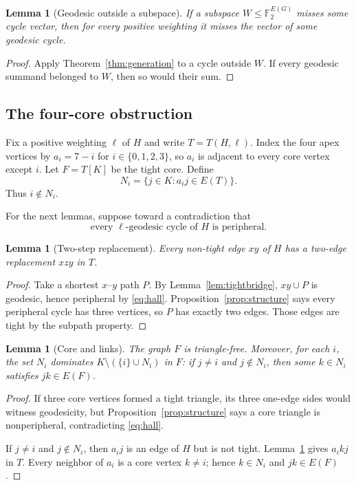 \documentclass[11pt]{amsart}
\newtheorem{lemma}[theorem]{Lemma}
\theoremstyle{definition}
\newcommand{\Ftwo}{\mathbb{F}_2}
\begin{document}
\begin{lemma}[Geodesic outside a subspace]\label{lem:geooutside}
If a subspace $W\leq\Ftwo^{E(G)}$ misses some cycle vector, then for every positive weighting it misses the vector of some geodesic cycle.
\end{lemma}

\begin{proof}
Apply Theorem~\ref{thm:generation} to a cycle outside $W$.  If every geodesic summand belonged to $W$, then so would their sum.
\end{proof}

\subsection{The four-core obstruction}

Fix a positive weighting $\ell$ of $H$ and write $T=T(H,\ell)$.  Index the four apex vertices by $a_i=7-i$ for $i\in\{0,1,2,3\}$, so $a_i$ is adjacent to every core vertex except $i$.  Let $F=T[K]$ be the tight core.  Define
\[
 N_i=\{j\in K: a_i j\in E(T)\}.
\]
Thus $i\notin N_i$.

For the next lemmas, suppose toward a contradiction that
\begin{equation}\label{eq:hall}
  \text{every $\ell$-geodesic cycle of $H$ is peripheral.}
\end{equation}

\begin{lemma}[Two-step replacement]\label{lem:twostep}
Every non-tight edge $xy$ of $H$ has a two-edge replacement $xzy$ in $T$.
\end{lemma}

\begin{proof}
Take a shortest $x$--$y$ path $P$.  By Lemma~\ref{lem:tightbridge}, $xy\cup P$ is geodesic, hence peripheral by \eqref{eq:hall}.  Proposition~\ref{prop:structure} says every peripheral cycle has three vertices, so $P$ has exactly two edges.  Those edges are tight by the subpath property.
\end{proof}

\begin{lemma}[Core and links]\label{lem:corelinks}
The graph $F$ is triangle-free.  Moreover, for each $i$, the set $N_i$ dominates $K\setminus(\{i\}\cup N_i)$ in $F$: if $j\ne i$ and $j\notin N_i$, then some $k\in N_i$ satisfies $jk\in E(F)$.
\end{lemma}

\begin{proof}
If three core vertices formed a tight triangle, its three one-edge sides would witness geodesicity, but Proposition~\ref{prop:structure} says a core triangle is nonperipheral, contradicting \eqref{eq:hall}.

If $j\ne i$ and $j\notin N_i$, then $a_i j$ is an edge of $H$ but is not tight.  Lemma~\ref{lem:twostep} gives $a_i k j$ in $T$.  Every neighbor of $a_i$ is a core vertex $k\ne i$; hence $k\in N_i$ and $jk\in E(F)$.
\end{proof}
\end{document}
